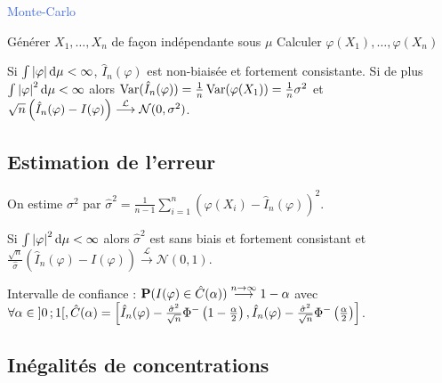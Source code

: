 

\begin{algorithm}[h]
\caption{\textcolor{RoyalBlue}{Monte-Carlo}}
	Générer $X_1,\ldots,X_n$ de façon indépendante sous $\mu$ \;
	Calculer $\varphi(X_1),\ldots,\varphi(X_n)$ \;
\end{algorithm}

\begin{pop}
	Si $\int \left\lvert\varphi\right\rvert \mathop{}\mathopen{}\mathrm{d} \mu < \infty$, $\hat{I}_n(\varphi)$ est non-biaisée et fortement consistante.
	Si de plus $\int \left\lvert\varphi\right\rvert^2 \mathop{}\mathopen{}\mathrm{d} \mu < \infty$ alors $\operatorname{Var}(\hat{I}_n(\varphi)) = \frac{1}{n} \operatorname{Var}(\varphi(X_1)) = \frac{1}{n} \sigma^2$ et $\sqrt{n} \left( \hat{I}_n(\varphi) - I(\varphi) \right) \overset{\mathcal{L}}{\longrightarrow} \mathcal{N}(0,\sigma^2)$.
\end{pop}


\subsection{Estimation de l'erreur}

	On estime $\sigma^2$ par $\hat{\sigma}^2 = \frac{1}{n - 1} \sum_{i = 1}^n \left( \varphi(X_i) - \hat{I}_n(\varphi) \right)^2$.

	\begin{pop}
		Si $\int \left\lvert\varphi\right\rvert^2 \mathop{}\mathopen{}\mathrm{d} \mu < \infty$ alors $\hat \sigma^2$ est sans biais et fortement consistant et $\frac{\sqrt{n}}{\hat{\sigma}} \left( \hat{I}_n(\varphi) - I(\varphi) \right) \overset{\mathcal{L}}{\longrightarrow} \mathcal{N}(0,1)$.
	\end{pop}

	\noindent Intervalle de confiance : $\mathbf{P}(I(\varphi) \in \hat{C}(\alpha)) \overset{n \to \infty}{\longrightarrow} 1 - \alpha$ avec
	$\forall \alpha \in \mathopen{]}0\mathclose{}\mathpunct{};1\mathclose{[}, \hat{C}(\alpha) = \left[ \hat{I}_n(\varphi) - \frac{\hat{\sigma}^2}{\sqrt{n}} \Phi^-\left( 1 - \frac{\alpha}{2} \right), \hat{I}_n(\varphi) - \frac{\hat{\sigma}^2}{\sqrt{n}} \Phi^-\left( \frac{\alpha}{2} \right) \right]$.


\subsection{Inégalités de concentrations}

